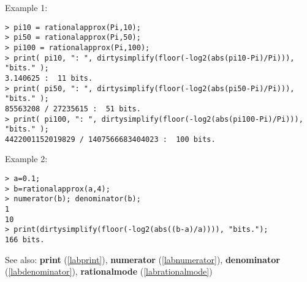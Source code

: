 \noindent Example 1: 
\begin{center}\begin{minipage}{15cm}\begin{Verbatim}[frame=single]
> pi10 = rationalapprox(Pi,10);
> pi50 = rationalapprox(Pi,50);
> pi100 = rationalapprox(Pi,100);
> print( pi10, ": ", dirtysimplify(floor(-log2(abs(pi10-Pi)/Pi))), "bits." );
3.140625 :  11 bits.
> print( pi50, ": ", dirtysimplify(floor(-log2(abs(pi50-Pi)/Pi))), "bits." );
85563208 / 27235615 :  51 bits.
> print( pi100, ": ", dirtysimplify(floor(-log2(abs(pi100-Pi)/Pi))), "bits." );
4422001152019829 / 1407566683404023 :  100 bits.
\end{Verbatim}
\end{minipage}\end{center}
\noindent Example 2: 
\begin{center}\begin{minipage}{15cm}\begin{Verbatim}[frame=single]
> a=0.1;
> b=rationalapprox(a,4);
> numerator(b); denominator(b);
1
10
> print(dirtysimplify(floor(-log2(abs((b-a)/a)))), "bits.");
166 bits.
\end{Verbatim}
\end{minipage}\end{center}
See also: \textbf{print} (\ref{labprint}), \textbf{numerator} (\ref{labnumerator}), \textbf{denominator} (\ref{labdenominator}), \textbf{rationalmode} (\ref{labrationalmode})
